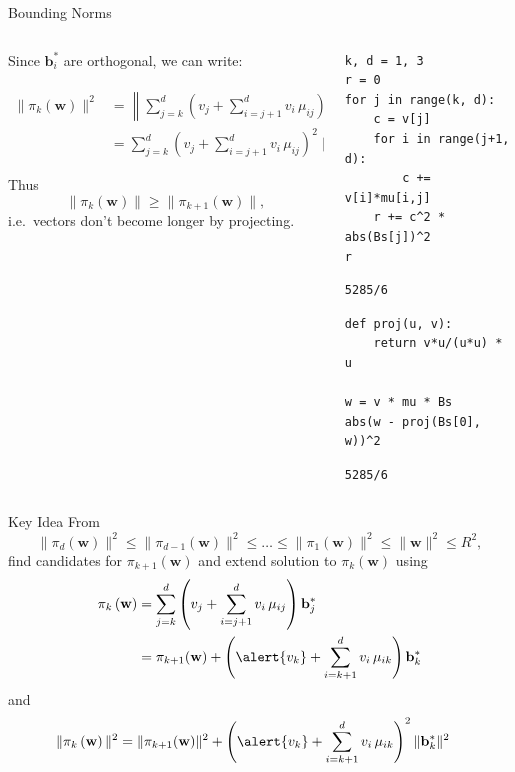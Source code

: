 \documentclass[presentation,smaller]{beamer}
\renewcommand{\vec}[1]{\mathbf{#1}\xspace}
\begin{document}
\begin{frame}[fragile,label={sec:orgbcc423d}]{Bounding Norms}
 \begin{columns}[t]
\begin{column}{0.6\columnwidth}
Since \(\vec{b}_i^*\) are orthogonal, we can write:

\begin{align*}
\|π_k\left(\vec{w}\right)\|^2 &= \left\|\sum_{j=k}^{d} \left(v_j  + \sum_{i=j+1}^{d} v_i\, \mu_{ij} \right) \vec{b}_j^*\right\|^2\\
&= \sum_{j=k}^{d} \left(v_j  + \sum_{i=j+1}^{d} v_i\, \mu_{ij} \right)^2 \|\vec{b}_j^*\|^2
\end{align*}



Thus \[\|π_{k}(\vec{w})\| ≥ \|π_{k+1}(\vec{w})\|,\] i.e. vectors don’t become longer by projecting.
\end{column}

\begin{column}{0.4\columnwidth}
\lstset{language=sage,label= ,caption= ,captionpos=b,numbers=none}
\begin{lstlisting}
k, d = 1, 3
r = 0
for j in range(k, d):
    c = v[j]
    for i in range(j+1, d):
        c += v[i]*mu[i,j]
    r += c^2 * abs(Bs[j])^2
r
\end{lstlisting}

\begin{verbatim}
5285/6
\end{verbatim}

\lstset{language=sage,label= ,caption= ,captionpos=b,numbers=none}
\begin{lstlisting}
def proj(u, v):
    return v*u/(u*u) * u

w = v * mu * Bs
abs(w - proj(Bs[0], w))^2
\end{lstlisting}

\begin{verbatim}
5285/6
\end{verbatim}
\end{column}
\end{columns}
\end{frame}

\begin{frame}[label={sec:org48aad03}]{Key Idea}
From \[\|π_{d}(\vec{w})\|^2 \leq \|π_{d-1}(\vec{w})\|^2 ≤ … ≤ \|π_{1}(\vec{w})\|^2 ≤ \|\vec{w}\|^2 \leq R^2,\] find candidates for \(π_{k+1}(\vec{w})\) and extend solution to \(π_{k}(\vec{w})\) using
\begin{align*}
\pi_k\left(\vec{w}\right) &= \sum_{j=k}^{d} \left(v_j  + \sum_{i=j+1}^{d} v_i\, \mu_{ij} \right) \vec{b}_j^*\\
&=  \pi_{k+1}(\vec{w}) + \left(\alert{v_k}  + \sum_{i=k+1}^{d} v_i\, \mu_{ik} \right) \vec{b}_k^*
\end{align*}
and
\begin{align*}
\|\pi_k\left(\vec{w}\right)\|^2 
&=  \|\pi_{k+1}(\vec{w})\|^2 + \left(\alert{v_k}  + \sum_{i=k+1}^{d} v_i\, \mu_{ik} \right)^2 \|\vec{b}_k^*\|^2
\end{align*}
\end{frame}
\end{document}
